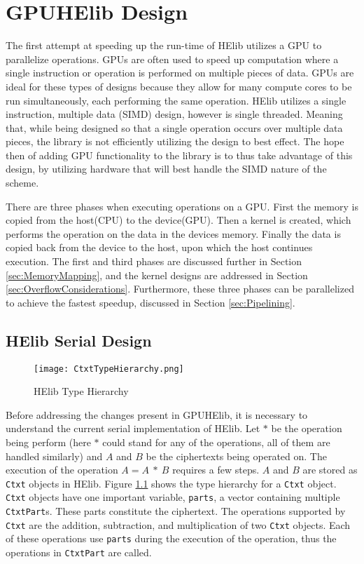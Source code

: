 \chapter{GPUHElib Design} \label{chap:GPUHElibDesign}
The first attempt at speeding up the run-time of HElib utilizes a GPU to parallelize operations. GPUs are often used to speed up computation where a single instruction or operation is performed on multiple pieces of data. GPUs are ideal for these types of designs because they allow for many compute cores to be run simultaneously, each performing the same operation. HElib utilizes a single instruction, multiple data (SIMD) design, however is single threaded. Meaning that, while being designed so that a single operation occurs over multiple data pieces, the library is not efficiently utilizing the design to best effect. The hope then of adding GPU functionality to the library is to thus take advantage of this design, by utilizing hardware that will best handle the SIMD nature of the scheme. 

There are three phases when executing operations on a GPU. First the memory is copied from the host(CPU) to the device(GPU). Then a kernel is created, which performs the operation on the data in the devices memory. Finally the data is copied back from the device to the host, upon which the host continues execution. The first and third phases are discussed further in Section \ref{sec:MemoryMapping}, and the kernel designs are addressed in Section \ref{sec:OverflowConsiderations}. Furthermore, these three phases can be parallelized to achieve the fastest speedup, discussed in Section \ref{sec:Pipelining}.

\section{HElib Serial Design} \label{sec:HElibSerialDesign}

\begin{figure}[htp]
\centering
\texttt{[image: CtxtTypeHierarchy.png]}
\caption{HElib Type Hierarchy}
\label{fig:CtxtTypeHierarchy}
\end{figure}
Before addressing the changes present in GPUHElib, it is necessary to understand the current serial implementation of HElib. Let $\ast$ be the operation being perform (here $\ast$ could stand for any of the operations, all of them are handled similarly) and $A$ and $B$ be the ciphertexts being operated on. The execution of the operation $ A = A\ \ast\  B$ requires a few steps. $A$ and $B$ are stored as \verb|Ctxt| objects in HElib. Figure \ref{fig:CtxtTypeHierarchy} shows the type hierarchy for a \verb|Ctxt| object. \verb|Ctxt| objects have one important variable, \verb|parts|, a vector containing multiple \verb|CtxtPart|s. These parts constitute the ciphertext. The operations supported by \verb|Ctxt| are the addition, subtraction, and multiplication of two \verb|Ctxt| objects. Each of these operations use \verb|parts| during the execution of the operation, thus the operations in \verb|CtxtPart| are called.

